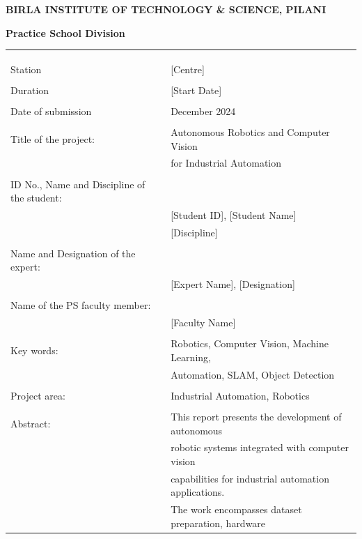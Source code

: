 \documentclass{book}
\begin{document}
\thispagestyle{empty}

	\centerline{\bf BIRLA INSTITUTE OF TECHNOLOGY \& SCIENCE, PILANI}
	\vspace*{0.2cm}
	\centerline{\bf Practice School Division}
	\vspace*{0.3cm}
	{\bf 
		\begin{tabular}{p{6cm}l}
			& \\
			& \\
			& \\
			Station & \hspace*{3cm} {[Centre]} \\
			& \\
			Duration &\hspace*{3cm} {[Start Date]} \\
			& \\
			Date of submission & December 2024 \\
			& \\
			Title of the project: & Autonomous Robotics and Computer Vision \\
			& for Industrial Automation \\
			& \\
			ID No., Name and Discipline of the student: & \\
			& {[Student ID]}, {[Student Name]} \\
			& {[Discipline]} \\
			& \\
			Name and Designation of the expert: & \\
			& {[Expert Name]}, {[Designation]} \\
			& \\
			Name of the PS faculty member: & \\
			& {[Faculty Name]} \\
			& \\
			Key words: & Robotics, Computer Vision, Machine Learning, \\
			& Automation, SLAM, Object Detection \\
			& \\
			Project area:  & Industrial Automation, Robotics \\
			& \\
			Abstract: & This report presents the development of autonomous \\
			& robotic systems integrated with computer vision \\
			& capabilities for industrial automation applications. \\
			& The work encompasses dataset preparation, hardware \\

\end{tabular}}
\end{document}
